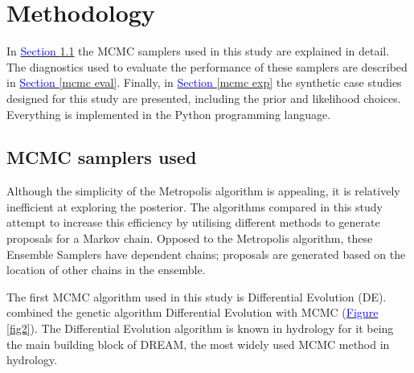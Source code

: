 \section{Methodology}\label{Methods}
In \hyperref[mcmc used]{\textcolor{blue}{Section }\ref{mcmc used}} the MCMC samplers used in this study are explained in detail. The diagnostics used to evaluate the performance of these samplers are described in \hyperref[mcmc eval]{\textcolor{blue}{Section }\ref{mcmc eval}}. Finally, in \hyperref[mcmc exp]{\textcolor{blue}{Section }\ref{mcmc exp}} the synthetic case studies designed for this study are presented, including the prior and likelihood choices. Everything is implemented in the Python programming language.

\subsection{MCMC samplers used}\label{mcmc used}
Although the simplicity of the Metropolis algorithm is appealing, it is relatively inefficient at exploring the posterior. The algorithms compared in this study attempt to increase this efficiency by utilising different methods to generate proposals for a Markov chain. Opposed to the Metropolis algorithm, these Ensemble Samplers have dependent chains; proposals are generated based on the location of other chains in the ensemble. 

The first MCMC algorithm used in this study is Differential Evolution (DE). \cite{terbraak2006markov} combined the genetic algorithm Differential Evolution \citep{storn1997differential} with MCMC (\hyperref[fig2]{\textcolor{blue}{Figure }\ref{fig2}}). The Differential Evolution algorithm is known in hydrology for it being the main building block of DREAM, the most widely used MCMC method in hydrology. %

